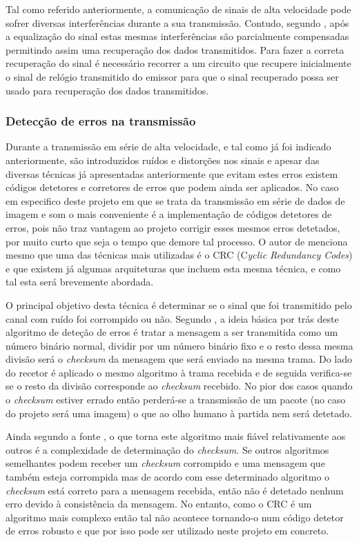 Tal como referido anteriormente, a comunicação de sinais de alta velocidade pode sofrer diversas interferências durante a sua transmissão. Contudo, segundo \cite{R012}, após a equalização do sinal estas mesmas interferências são parcialmente compensadas permitindo assim uma recuperação dos dados transmitidos.  Para fazer a correta recuperação do sinal é necessário recorrer a um circuito que recupere inicialmente o sinal de relógio transmitido do emissor para que o sinal recuperado possa ser usado para recuperação dos dados transmitidos. 

\subsubsection*{Detecção de erros na transmissão}

Durante a transmissão em série de alta velocidade, e tal como já foi indicado anteriormente, são introduzidos ruídos e distorções nos sinais e apesar das diversas técnicas já apresentadas anteriormente que evitam estes erros existem códigos detetores e corretores de erros que podem ainda ser aplicados.
No caso em especifico deste projeto em que se trata da transmissão em série de dados de imagem e som o mais conveniente é a implementação de códigos detetores de erros, pois não traz vantagem ao projeto corrigir esses mesmos erros detetados, por muito curto que seja o tempo que demore tal processo. O autor de \cite{R012} menciona mesmo que uma das técnicas mais utilizadas é o CRC (C\textit{yclic Redundancy Codes}) e que existem já algumas arquiteturas que incluem esta mesma técnica, e como tal esta será brevemente abordada. 

O principal objetivo desta técnica é determinar se o sinal que foi transmitido pelo canal com ruído foi corrompido ou não. Segundo \cite{R028}, a ideia básica por trás deste algoritmo de deteção de erros é tratar a mensagem a ser transmitida como um número binário normal, dividir por um número binário fixo e o resto dessa mesma divisão será o \textit{checksum} da mensagem que será enviado na mesma trama. Do lado do recetor é aplicado o mesmo algoritmo à trama recebida e de seguida verifica-se se o resto da divisão corresponde ao \textit{checksum} recebido. No pior dos casos quando o \textit{checksum} estiver errado então perderá-se a transmissão de um pacote (no caso do projeto será uma imagem) o que ao olho humano à partida nem será detetado.

Ainda segundo a fonte \cite{R028}, o que torna este algoritmo mais fiável relativamente aos outros é a complexidade de determinação do \textit{checksum}. Se outros algoritmos semelhantes podem receber um \textit{checksum} corrompido e uma mensagem que também esteja corrompida mas de acordo com esse determinado algoritmo o \textit{checksum} está correto para a mensagem recebida, então não é detetado nenhum erro devido à consistência da mensagem. No entanto, como o CRC é um algoritmo mais complexo então tal não acontece tornando-o num código detetor de erros robusto e que por isso pode ser utilizado neste projeto em concreto.



